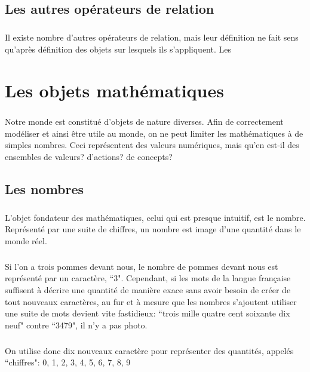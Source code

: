 \documentclass[a4paper]{book}
\begin{document}
    \section{Les autres opérateurs de relation}
    \paragraph{}
    Il existe nombre d'autres opérateurs de relation, mais leur définition ne fait sens qu'après définition des objets sur lesquels ils s'appliquent.
    Les 
    
    
    \chapter{Les objets mathématiques}
    \paragraph{}
    Notre monde est constitué d'objets de nature diverses. Afin de correctement modéliser et ainsi être utile au monde, on ne peut limiter les mathématiques à de simples nombres. Ceci représentent des valeurs numériques, mais qu'en est-il des ensembles de valeurs? d'actions? de concepts?
    \section{Les nombres}
    \paragraph{}
    L'objet fondateur des mathématiques, celui qui est presque intuitif, est le nombre. Représenté par une suite de chiffres, un nombre est image d'une quantité dans le monde réel.
    \paragraph{}
    Si l'on a trois pommes devant nous, le nombre de pommes devant nous est représenté par un caractère, ``3". Cependant, si les mots de la langue française suffisent à décrire une quantité de manière exace sans avoir besoin de créer de tout nouveaux caractères, au fur et à mesure que les nombres s'ajoutent utiliser une suite de mots devient vite fastidieux: ``trois mille quatre cent soixante dix neuf" contre ``3479", il n'y a pas photo.%
    \paragraph{}
    On utilise donc dix nouveaux caractère pour représenter des quantités, appelés ``chiffres": 0, 1, 2, 3, 4, 5, 6, 7, 8, 9
\end{document}
